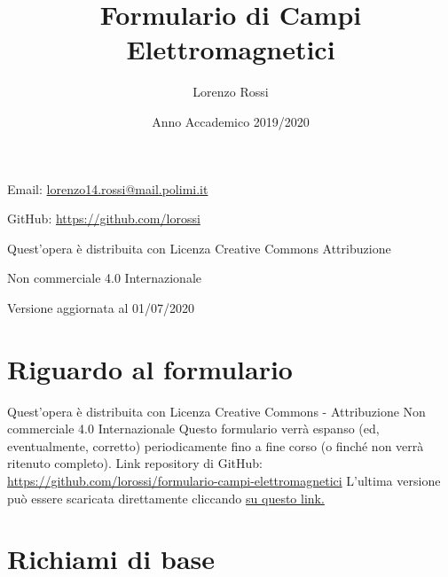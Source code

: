 \documentclass{article}
\title{\Huge Formulario di Campi Elettromagnetici}
\author{\LARGE Lorenzo Rossi}
\date{\LARGE Anno Accademico 2019/2020}
\begin{document}
\maketitle

\vspace{18em}

\large
\begin{doublespacing}\hypersetup{
	urlcolor=black,
}
\centerline{Email: \href{mailto://lorenzo14.rossi@mail.polimi.it}{lorenzo14.rossi@mail.polimi.it}}
\centerline{GitHub: \url{https://github.com/lorossi}}

\vspace{18em}
\centerline{Quest'opera è distribuita con Licenza Creative Commons Attribuzione}
\centerline{Non commerciale 4.0 Internazionale \ccbynceu}
\centerline{Versione aggiornata al 01/07/2020}
\end{doublespacing}
\newpage


\tableofcontents
\clearpage
{}
\newpage

\section{Riguardo al formulario}
Quest'opera è distribuita con Licenza Creative Commons - Attribuzione Non commerciale 4.0 Internazionale \ccbynceu \newline
Questo formulario verrà espanso (ed, eventualmente, corretto) periodicamente fino a fine corso (o finché non verrà ritenuto completo). \newline
Link repository di GitHub: \url{https://github.com/lorossi/formulario-campi-elettromagnetici} \newline
L'ultima versione può essere scaricata direttamente cliccando \href{https://github.com/lorossi/formulario-campi-elettromagnetici/raw/master/formulario_campi.pdf}{su questo link.}

\section{Richiami di base}
\end{document}
